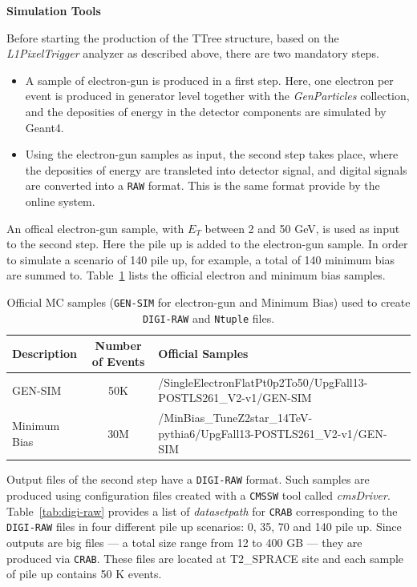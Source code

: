 \vspace{0.5 cm}
\textbf{Simulation Tools}

Before starting the production of the TTree structure, based on the \textit{L1PixelTrigger} analyzer as described
above, there are two mandatory steps.
\begin{itemize}
\item A sample of electron-gun is produced in a first step. Here, one electron per event is produced in generator
  level together with the {\it GenParticles} collection, and the deposities of energy in the detector components
  are simulated by Geant4.
\item Using the electron-gun samples as input, the second step takes place, where the deposities of energy are
  transleted into detector signal, and digital signals are converted into a {\texttt{RAW}} format. This is the
  same format provide by the online system.
\end{itemize}

An offical electron-gun sample, with $E_{T}$ between 2 and 50 GeV, is used as input to the second step. Here the
pile up is added to the electron-gun sample. In order to simulate a scenario of 140 pile up, for example, a total of 140
minimum bias are summed to. Table~\ref{tab:gen-sim-minbias} lists the official electron and minimum bias samples.

\begin{table}[!htb]
  \centering
  \scriptsize
  \caption{Official MC samples (\texttt{GEN-SIM} for electron-gun and Minimum Bias) used to create
    \texttt{DIGI-RAW} and \texttt{Ntuple} files.}
  \label{tab:gen-sim-minbias}
  \begin{tabular}{lcl}
    \hline
        {\bf Description} & {\bf Number of Events} & {\bf Official Samples} \\ \hline \hline
        GEN-SIM           & 50K                    & /SingleElectronFlatPt0p2To50/UpgFall13-POSTLS261\_V2-v1/GEN-SIM \\ \hline
        Minimum Bias      & 30M                    & /MinBias\_TuneZ2star\_14TeV-pythia6/UpgFall13-POSTLS261\_V2-v1/GEN-SIM \\ \hline
  \end{tabular}
\end{table}

Output files of the second step have a \texttt{DIGI-RAW} format. Such samples are produced using configuration
files created with a \texttt{CMSSW} tool called {\it cmsDriver}. Table~\ref{tab:digi-raw} provides a list of
{\it datasetpath} for \texttt{CRAB} corresponding to the \texttt{DIGI-RAW} files in four different pile up
scenarios: 0, 35, 70 and 140 pile up. Since outputs are big files --- a total size range from 12 to 400 GB ---
they are produced via \texttt{CRAB}. These files are located at T2\_SPRACE site and each sample of pile up
contains 50 K events.


